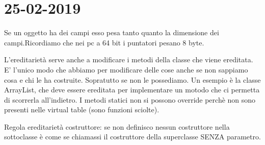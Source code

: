 

\newpage
\section{25-02-2019}
Se un oggetto ha dei campi esso pesa tanto quanto la dimensione dei campi.Ricordiamo che nei pc a 64 bit i puntatori pesano 8 byte.

\noindent L'ereditarietà serve anche a modificare i metodi della classe che viene ereditata. E' l'unico modo che abbiamo per modificare delle cose anche se non sappiamo cosa e chi le ha costruite. Sopratutto se non le possediamo. Un esempio è la classe ArrayList, che deve essere ereditata per implementare un motodo che ci permetta di scorrerla all'indietro. \newline
I metodi statici non si possono override perchè non sono presenti nelle virtual table (sono funzioni sciolte). \newline

Regola ereditarietà costruttore: se non definisco nessun costruttore nella sottoclasse è come se chiamassi il costruttore della superclasse SENZA parametro. 






